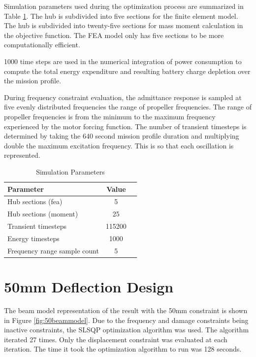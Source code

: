 \documentclass[doublespace,nopageskip]{VTthesis}
\begin{document}
{	Simulation parameters used during the optimization process are summarized in Table \ref{tab:simulation_settings}. The hub is subdivided into five sections for the finite element model. The hub is subdivided into twenty-five sections for mass moment calculation in the objective function. The FEA model only has five sections to be more computationally efficient.   
	
	1000 time steps are used in the numerical integration of power consumption to compute the total energy expenditure and resulting battery charge depletion over the mission profile.
	
	During frequency constraint evaluation, the admittance response is sampled at five evenly distributed frequencies the range of propeller frequencies. The range of propeller frequencies is from the minimum to the maximum frequency experienced by the motor forcing function. The number of transient timesteps is determined by taking the 640 second mission profile duration and multiplying double the maximum excitation frequency. This is so that each oscillation is represented.  
	
	\begin{table}[H]
		\centering
		\caption{Simulation Parameters}
		\label{tab:simulation_settings}
		\begin{tabular}{l c p{7cm}}
			\hline
			\textbf{Parameter} & \textbf{Value} \\
			\hline
			Hub sections (fea) & 5 \\
			Hub sections (moment) & 25 \\
			Transient timesteps & 115200 \\
			Energy timesteps & 1000 \\
			Frequency range sample count & 5 \\
			\hline
		\end{tabular}
	\end{table}
	
	\section{50mm Deflection Design} \label{se:50mm}
		
		The beam model representation of the result with the 50mm constraint is shown in Figure \ref{fig:50beammodel}. Due to the frequency and damage constraints being inactive constraints, the SLSQP optimization algorithm was used. The algorithm iterated 27 times. Only the displacement constraint was evaluated at each iteration. The time it took the optimization algorithm to run was 128 seconds. 
		
}
\end{document}
